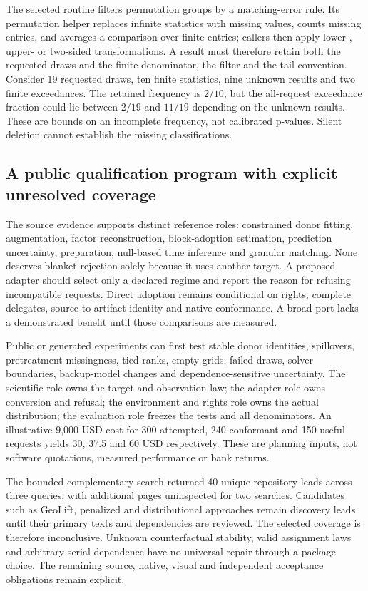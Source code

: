 The selected routine filters permutation groups by a matching-error rule.
Its permutation helper replaces infinite statistics with missing values,
counts missing entries, and averages a comparison over finite entries;
callers then apply lower-, upper- or two-sided transformations. A result
must therefore retain both the requested draws and the finite denominator,
the filter and the tail convention. Consider 19 requested draws, ten finite
statistics, nine unknown results and two finite exceedances. The retained
frequency is $2/10$, but the all-request exceedance fraction could lie
between $2/19$ and $11/19$ depending on the unknown results. These are bounds
on an incomplete frequency, not calibrated p-values. Silent deletion cannot
establish the missing classifications.\citep{exec25_synthr_microsynth,
exec25_synthr_choice}

\subsection{A public qualification program with explicit unresolved coverage}
The source evidence supports distinct reference roles: constrained donor
fitting, augmentation, factor reconstruction, block-adoption estimation,
prediction uncertainty, preparation, null-based time inference and granular
matching. None deserves blanket rejection solely because it uses another
target. A proposed adapter should select only a declared regime and report
the reason for refusing incompatible requests. Direct adoption remains
conditional on rights, complete delegates, source-to-artifact identity and
native conformance. A broad port lacks a demonstrated benefit until those
comparisons are measured.\citep{exec25_synthr_choice}

Public or generated experiments can first test stable donor identities,
spillovers, pretreatment missingness, tied ranks, empty grids, failed draws,
solver boundaries, backup-model changes and dependence-sensitive uncertainty.
The scientific role owns the target and observation law; the adapter role
owns conversion and refusal; the environment and rights role owns the actual
distribution; the evaluation role freezes the tests and all denominators.
An illustrative 9,000 USD cost for 300 attempted, 240 conformant and 150 useful
requests yields 30, 37.5 and 60 USD respectively. These are planning inputs,
not software quotations, measured performance or bank returns.
\citep{exec25_synthr_choice}

The bounded complementary search returned 40 unique repository leads across
three queries, with additional pages uninspected for two searches. Candidates
such as GeoLift, penalized and distributional approaches remain discovery
leads until their primary texts and dependencies are reviewed. The selected
coverage is therefore inconclusive. Unknown counterfactual stability, valid
assignment laws and arbitrary serial dependence have no universal repair
through a package choice. The remaining source, native, visual and independent
acceptance obligations remain explicit.\citep{exec25_synthr_choice}
